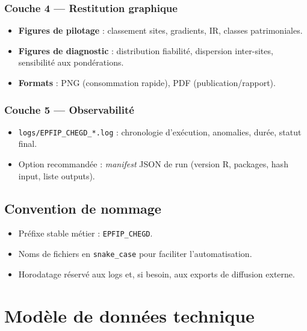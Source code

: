\documentclass[11pt,a4paper]{article}
\begin{document}
\subsubsection{Couche 4 --- Restitution graphique}
\begin{itemize}[leftmargin=1.2cm]
  \item \textbf{Figures de pilotage} : classement sites, gradients, IR, classes patrimoniales.
  \item \textbf{Figures de diagnostic} : distribution fiabilité, dispersion inter-sites, sensibilité aux pondérations.
  \item \textbf{Formats} : PNG (consommation rapide), PDF (publication/rapport).
\end{itemize}

\subsubsection{Couche 5 --- Observabilité}
\begin{itemize}[leftmargin=1.2cm]
  \item \texttt{logs/EPFIP\_CHEGD\_*.log} : chronologie d'exécution, anomalies, durée, statut final.
  \item Option recommandée : \textit{manifest} JSON de run (version R, packages, hash input, liste outputs).
\end{itemize}

\subsection{Convention de nommage}
\begin{itemize}[leftmargin=1.2cm]
  \item Préfixe stable métier : \texttt{EPFIP\_CHEGD}.
  \item Noms de fichiers en \texttt{snake\_case} pour faciliter l'automatisation.
  \item Horodatage réservé aux logs et, si besoin, aux exports de diffusion externe.
\end{itemize}

\section{Modèle de données technique}
\end{document}
